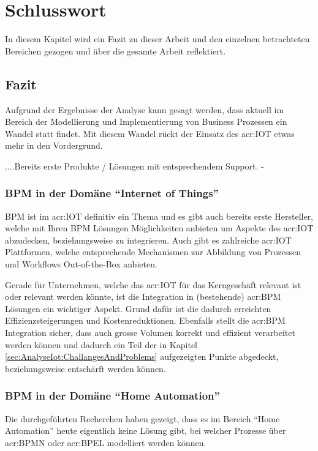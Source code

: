 
\chapter{Schlusswort} \label{chap:Finish}
In diesem Kapitel wird ein Fazit zu dieser Arbeit und den einzelnen betrachteten Bereichen gezogen und über die gesamte Arbeit reflektiert.

\section{Fazit}
Aufgrund der Ergebnisse der Analyse kann gesagt werden, dass aktuell im Bereich der Modellierung und Implementierung von Business Prozessen ein Wandel statt findet. Mit diesem Wandel rückt der Einsatz des \gls{acr:IOT} etwas mehr in den Vordergrund. 

....Bereits erste Produkte / Lösungen mit entsprechendem Support.
-

\subsection{BPM in der Domäne "`Internet of Things"'}
BPM ist im \gls{acr:IOT} definitiv ein Thema und es gibt auch bereits erste Hersteller, welche mit Ihren BPM Lösungen Möglichkeiten anbieten um Aspekte des \gls{acr:IOT} abzudecken, beziehungsweise zu integrieren. Auch gibt es zahlreiche \gls{acr:IOT} Plattformen, welche entsprechende Mechanismen zur Abbildung von Prozessen und Workflows Out-of-the-Box anbieten.

Gerade für Unternehmen, welche das \gls{acr:IOT} für das Kerngeschäft relevant ist oder relevant werden könnte, ist die Integration in (bestehende) \gls{acr:BPM} Lösungen ein wichtiger Aspekt. Grund dafür ist die dadurch erreichten Effizienzsteigerungen und Kostenreduktionen. Ebenfalls stellt die \gls{acr:BPM} Integration sicher, dass auch grosse Volumen korrekt und effizient verarbeitet werden können und dadurch ein Teil der in Kapitel \ref{sec:AnalyseIot:ChallangesAndProblems}  aufgezeigten Punkte abgedeckt, beziehungsweise entschärft werden können.

\subsection{BPM in der Domäne "`Home Automation"'}
Die durchgeführten Recherchen haben gezeigt, dass es im Bereich "`Home Automation"' heute eigentlich keine Lösung gibt, bei welcher Prozesse über \gls{acr:BPMN} oder \gls{acr:BPEL} modelliert werden können.



